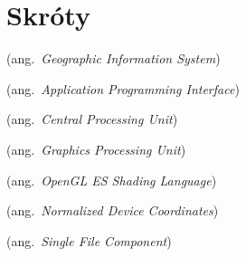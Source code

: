 \chapter*{Skróty}\mbox{}
\label{sec:skroty}
\noindent
\begin{description}[labelwidth=*]
  \item [GIS] (ang.\ \emph{Geographic Information System})
  \item [API] (ang.\ \emph{Application Programming Interface})
  \item [CPU] (ang.\ \emph{Central Processing Unit})
  \item [GPU] (ang.\ \emph{Graphics Processing Unit})
  \item [ESSL] (ang.\ \emph{OpenGL ES Shading Language})
  \item [NDC] (ang.\ \emph{Normalized Device Coordinates})
  \item [SFC] (ang.\ \emph{Single File Component})
\end{description}

